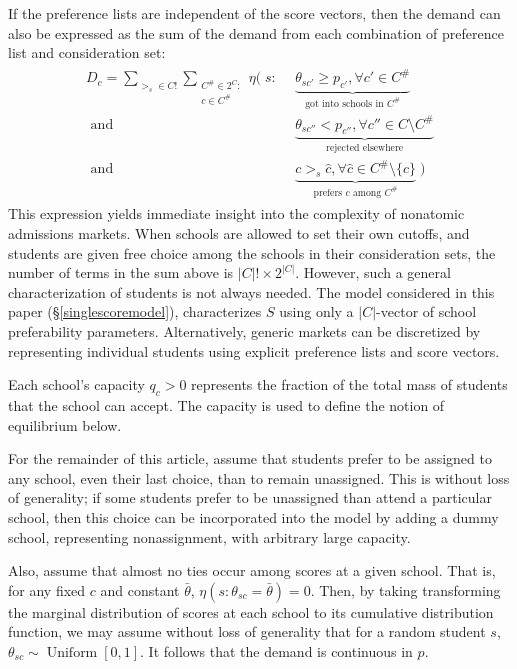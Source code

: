 \documentclass[12pt]{article}
\theoremstyle{definition}
\begin{document}
If the preference lists are independent of the score vectors, then the demand can also be expressed as the sum of the demand from each combination of preference list and consideration set:
\begin{gather} \label{demandbigsum}
\begin{aligned}
D_c = 
\sum_{>_s \in C!} \sum_{\substack{C^\# \in 2^{C}:\\ c \in C^\#}}
\eta\Big(\;s:&~~\underbrace{\theta_{sc'} \geq p_{c'}, \forall c' \in C^\#}_{\text{got into schools in } C^\# } \\
\text{ and} &~~\underbrace{\theta_{sc''} < p_{c''}, \forall c'' \in C \setminus C^\#}_{\text{rejected elsewhere}} \\
\text{ and} &~~\underbrace{c >_s \hat c, \forall \hat c \in C^\#\setminus \{c\}}_{\text{prefers } c \text{ among } C^\#} \;\Big)
\end{aligned}
\end{gather}
This expression yields immediate insight into the complexity of nonatomic admissions markets. When schools are allowed to set their own cutoffs, and students are given free choice among the schools in their consideration sets, the number of terms in the sum above is $|C|!\times2^{|C|}$. However, such a general characterization of students is not always needed. The model considered in this paper (\S\ref{singlescoremodel}), characterizes $S$ using only a $|C|$-vector of school preferability parameters. Alternatively, generic markets can be discretized by representing individual students using explicit preference lists and score vectors. 

Each school's capacity $q_c > 0$ represents the fraction of the total mass of students that the school can accept. The capacity is used to define the notion of equilibrium below.

For the remainder of this article, assume that students prefer to be assigned to any school, even their last choice, than to remain unassigned. This is without loss of generality; if some students prefer to be unassigned than attend a particular school, then this choice can be incorporated into the model by adding a dummy school, representing nonassignment, with arbitrary large capacity.

Also, assume that almost no ties occur among scores at a given school. That is, for any fixed $c$ and constant $\bar \theta$, $\eta( s: \theta_{sc} = \bar \theta) = 0$. Then, by taking transforming the marginal distribution of scores at each school to its cumulative distribution function, we may assume without loss of generality that for a random student $s$, $\theta_{sc} \sim \operatorname{Uniform}[0, 1]$. It follows that the demand is continuous in $p$. 
\end{document}
